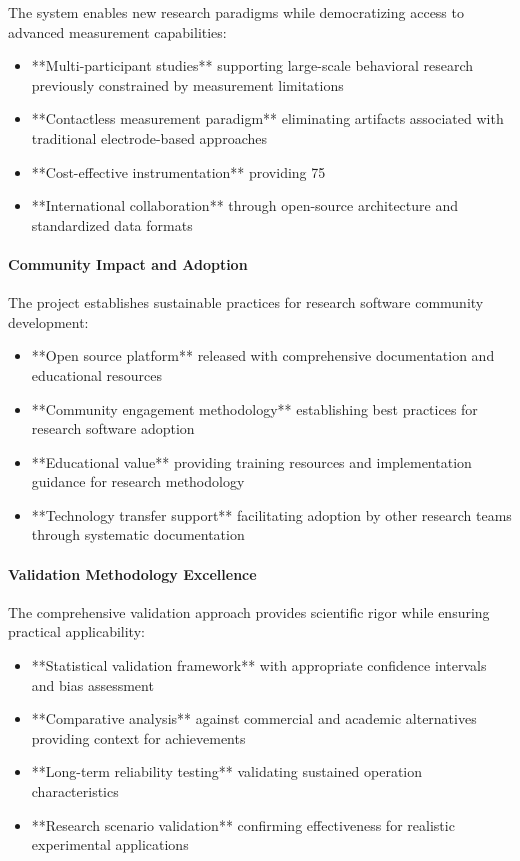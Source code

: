 \documentclass[12pt,a4paper]{article}
\begin{document}
The system enables new research paradigms while democratizing access to advanced measurement capabilities:

\begin{itemize}
\item **Multi-participant studies** supporting large-scale behavioral research previously constrained by measurement
  limitations
\item **Contactless measurement paradigm** eliminating artifacts associated with traditional electrode-based approaches
\item **Cost-effective instrumentation** providing 75%
\item **International collaboration** through open-source architecture and standardized data formats

\end{itemize}
\paragraph{Community Impact and Adoption}

The project establishes sustainable practices for research software community development:

\begin{itemize}
\item **Open source platform** released with comprehensive documentation and educational resources
\item **Community engagement methodology** establishing best practices for research software adoption
\item **Educational value** providing training resources and implementation guidance for research methodology
\item **Technology transfer support** facilitating adoption by other research teams through systematic documentation

\end{itemize}
\paragraph{Validation Methodology Excellence}

The comprehensive validation approach provides scientific rigor while ensuring practical applicability:

\begin{itemize}
\item **Statistical validation framework** with appropriate confidence intervals and bias assessment
\item **Comparative analysis** against commercial and academic alternatives providing context for achievements
\item **Long-term reliability testing** validating sustained operation characteristics
\item **Research scenario validation** confirming effectiveness for realistic experimental applications

\end{itemize}
\end{document}
